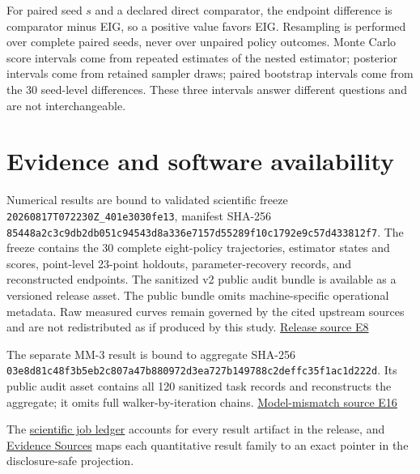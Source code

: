 For paired seed \(s\) and a declared direct comparator, the endpoint
difference is comparator minus EIG, so a positive value favors EIG.
Resampling is performed over complete paired seeds, never over unpaired
policy outcomes. Monte Carlo score intervals come from repeated
estimates of the nested estimator; posterior intervals come from
retained sampler draws; paired bootstrap intervals come from the 30
seed-level differences. These three intervals answer different questions
and are not interchangeable.

\hypertarget{evidence-and-software-availability}{%
\section{Evidence and software
availability}\label{evidence-and-software-availability}}

Numerical results are bound to validated scientific freeze
\texttt{20260817T072230Z\_401e3030fe13}, manifest SHA-256
\texttt{85448a2c\allowbreak{}3c9db2db\allowbreak{}051c9454\allowbreak{}3d8a336e\allowbreak{}7157d552\allowbreak{}89f10c17\allowbreak{}92e9c57d\allowbreak{}433812f7}.
The freeze contains the 30 complete eight-policy trajectories, estimator
states and scores, point-level 23-point holdouts, parameter-recovery
records, and reconstructed endpoints. The sanitized v2 public audit
bundle is available as a versioned release asset. The public bundle
omits machine-specific operational metadata. Raw measured curves remain
governed by the cited upstream sources and are not redistributed as if
produced by this study.
\href{https://github.com/hoangduong6210/EIG-bayesian-for-Recover-potential-Physical-Parameter-of-MagComponent/blob/927bbcb6d0b862598fae87d2575a872bbd79b5f1/wiki/evidence/Evidence-Sources.md\#e8}{Release
source E8}

The separate MM-3 result is bound to aggregate SHA-256
\texttt{03e8d81c\allowbreak{}48f3b5eb\allowbreak{}2c807a47\allowbreak{}b880972d\allowbreak{}3ea727b1\allowbreak{}49788c2d\allowbreak{}effc35f1\allowbreak{}ac1d222d}.
Its public audit asset contains all 120 sanitized task records and
reconstructs the aggregate; it omits full walker-by-iteration chains.
\href{https://github.com/hoangduong6210/EIG-bayesian-for-Recover-potential-Physical-Parameter-of-MagComponent/blob/927bbcb6d0b862598fae87d2575a872bbd79b5f1/wiki/evidence/Evidence-Sources.md\#e16}{Model-mismatch
source E16}

The
\href{https://github.com/hoangduong6210/EIG-bayesian-for-Recover-potential-Physical-Parameter-of-MagComponent/blob/927bbcb6d0b862598fae87d2575a872bbd79b5f1/wiki/results/Scientific-Job-Results.md}{scientific
job ledger} accounts for every result artifact in the release, and
\href{https://github.com/hoangduong6210/EIG-bayesian-for-Recover-potential-Physical-Parameter-of-MagComponent/blob/927bbcb6d0b862598fae87d2575a872bbd79b5f1/wiki/evidence/Evidence-Sources.md}{Evidence
Sources} maps each quantitative result family to an exact pointer in the
disclosure-safe projection.
